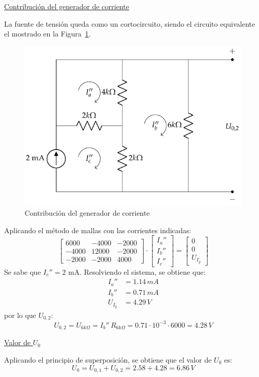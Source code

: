 \begin{example}
    \underline{Contribución del generador de corriente}
    
    La fuente de tensión queda como un cortocircuito, siendo el circuito equivalente el mostrado en la Figura~\ref{fig.ej_superposicion_cc_corriente}. 
    \begin{figure}[H]
        \centering
        \includegraphics[width=0.4\linewidth]{../figs/ej_superposicion_cc_corriente.pdf}
        \caption{Contribución del generador de corriente}
        \label{fig.ej_superposicion_cc_corriente}
    \end{figure}
    
    Aplicando el método de mallas con las corrientes indicadas:
    \begin{equation*}
        \begin{bmatrix}
            6000 & -4000 & -2000\\
            -4000 & 12000 & -2000\\
            -2000 & -2000 & 4000
        \end{bmatrix}
        \cdot
        \begin{bmatrix}
            I_a''\\
            I_b''\\
            I_c''
        \end{bmatrix}
        =
        \begin{bmatrix}
            0\\
            0\\
            U_{I_g}
        \end{bmatrix}
    \end{equation*}
    Se sabe que $I_c''=2$ mA. Resolviendo el sistema, se obtiene que:
    \begin{align*}
        I_a''&=1.14\,mA\\
        I_b''&=0.71\,mA\\
        U_{I_g}&=4.29\,V
    \end{align*}
    por lo que $U_{0,2}$:
    \begin{equation*}
        U_{0,2}=U_{6k\Omega}=I_b''\, R_{6k\Omega}=0.71\cdot 10^{-3}\cdot 6000= 4.28\,V
    \end{equation*}
    
    \underline{Valor de $U_0$}
    
    Aplicando el principio de superposición, se obtiene que el valor de $U_0$ es:
    \begin{equation*}
        U_0=U_{0,1}+U_{0,2}=2.58+4.28=6.86\, V
    \end{equation*}
\end{example}





